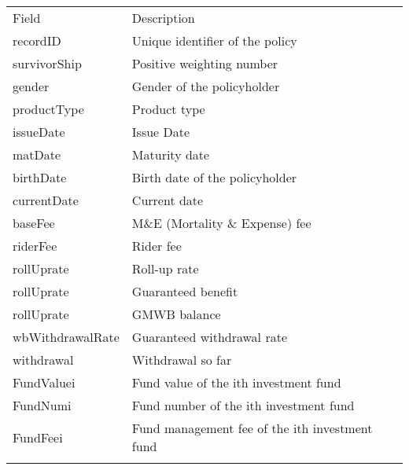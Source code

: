 \renewcommand{\arraystretch}{1.5}
\begin{center}
			\begin{tabular}{l l l}
			\topline
			\headcol Field & Description \\
			\midline
			recordID & Unique identifier of the policy \\
			survivorShip & Positive weighting number\\
			gender & Gender of the policyholder \\
			productType & Product type \\
			issueDate & Issue Date \\
			matDate & Maturity date\\
			birthDate & Birth date of the policyholder \\
			currentDate & Current date\\
			baseFee & M\&E (Mortality \& Expense) fee \\
			riderFee & Rider fee \\
			rollUprate & Roll-up rate\\
			rollUprate & Guaranteed benefit\\
			rollUprate & GMWB balance\\
			wbWithdrawalRate & Guaranteed withdrawal rate\\
			withdrawal & Withdrawal so far\\
			FundValuei & Fund value of the ith investment fund\\
			FundNumi & Fund number of the ith investment fund\\
			FundFeei & Fund management fee of the ith investment fund\\
			\bottomlinec
\end{tabular}
\end{center}    


 